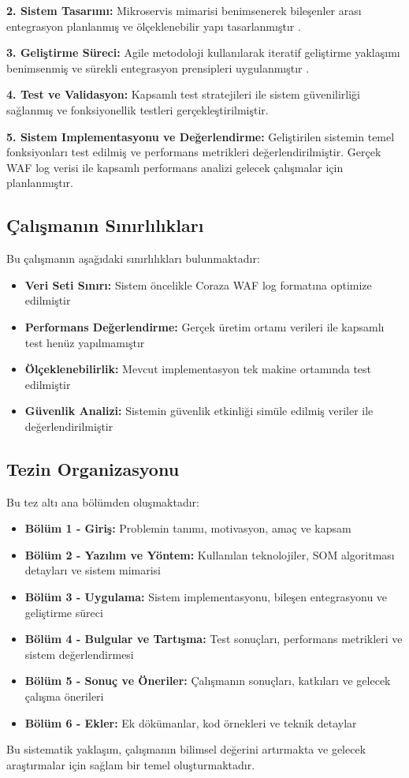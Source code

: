 \textbf{2. Sistem Tasarımı:} Mikroservis mimarisi benimsenerek bileşenler arası entegrasyon planlanmış ve ölçeklenebilir yapı tasarlanmıştır \cite{docker2023}.

\textbf{3. Geliştirme Süreci:} Agile metodoloji kullanılarak iteratif geliştirme yaklaşımı benimsenmiş ve sürekli entegrasyon prensipleri uygulanmıştır \cite{devops_security2022}.

\textbf{4. Test ve Validasyon:} Kapsamlı test stratejileri ile sistem güvenilirliği sağlanmış ve fonksiyonellik testleri gerçekleştirilmiştir.

\textbf{5. Sistem Implementasyonu ve Değerlendirme:} Geliştirilen sistemin temel fonksiyonları test edilmiş ve performans metrikleri değerlendirilmiştir. Gerçek WAF log verisi ile kapsamlı performans analizi gelecek çalışmalar için planlanmıştır.

\subsection{Çalışmanın Sınırlılıkları}

Bu çalışmanın aşağıdaki sınırlılıkları bulunmaktadır:

\begin{itemize}
    \item \textbf{Veri Seti Sınırı:} Sistem öncelikle Coraza WAF log formatına optimize edilmiştir
    \item \textbf{Performans Değerlendirme:} Gerçek üretim ortamı verileri ile kapsamlı test henüz yapılmamıştır
    \item \textbf{Ölçeklenebilirlik:} Mevcut implementasyon tek makine ortamında test edilmiştir
    \item \textbf{Güvenlik Analizi:} Sistemin güvenlik etkinliği simüle edilmiş veriler ile değerlendirilmiştir
\end{itemize}

\newpage

\subsection{Tezin Organizasyonu}

Bu tez altı ana bölümden oluşmaktadır:

\begin{itemize}
    \item \textbf{Bölüm 1 - Giriş:} Problemin tanımı, motivasyon, amaç ve kapsam
    \item \textbf{Bölüm 2 - Yazılım ve Yöntem:} Kullanılan teknolojiler, SOM algoritması detayları ve sistem mimarisi
    \item \textbf{Bölüm 3 - Uygulama:} Sistem implementasyonu, bileşen entegrasyonu ve geliştirme süreci
    \item \textbf{Bölüm 4 - Bulgular ve Tartışma:} Test sonuçları, performans metrikleri ve sistem değerlendirmesi
    \item \textbf{Bölüm 5 - Sonuç ve Öneriler:} Çalışmanın sonuçları, katkıları ve gelecek çalışma önerileri
    \item \textbf{Bölüm 6 - Ekler:} Ek dökümanlar, kod örnekleri ve teknik detaylar
\end{itemize}

Bu sistematik yaklaşım, çalışmanın bilimsel değerini artırmakta ve gelecek araştırmalar için sağlam bir temel oluşturmaktadır.
